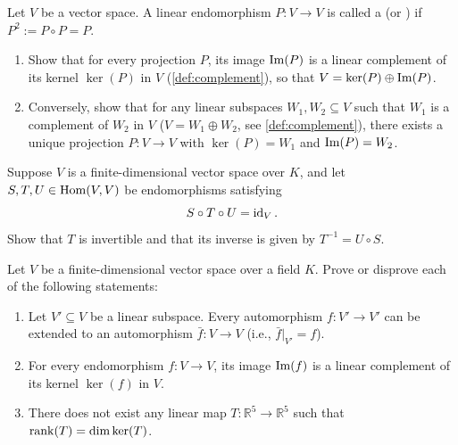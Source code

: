 \begin{exercise}
\label{exc:projections_and_complements}
Let $V$ be a vector space. A linear endomorphism $P \colon V \to V$ is called a  (or ) if $P^2 := P \circ P = P$.
\begin{enumerate}[label=\textbf{(\alph*)}]
    \item Show that for every projection $P$, its image $\operatorname{Im}(P)$ is a linear complement of its kernel $\ker(P)$ in $V$ (\cref{def:complement}), so that $V = \ker(P) \oplus \operatorname{Im}(P)$.
    \item Conversely, show that for any linear subspaces $W_1, W_2 \subseteq V$ such that $W_1$ is a complement of $W_2$ in $V$ ($V = W_1 \oplus W_2$, see \cref{def:complement}), there exists a unique projection $P \colon V \to V$ with $\ker(P) = W_1$ and $\operatorname{Im}(P) = W_2$.
\end{enumerate}
\end{exercise}

\begin{exercise}
\label{exc:invertibility_three_map_composition}
Suppose $V$ is a finite-dimensional vector space over $K$, and let $S, T, U \in \operatorname{Hom}(V, V)$ be endomorphisms satisfying
\[
S \circ T \circ U = \operatorname{id}_V.
\]
Show that $T$ is invertible and that its inverse is given by $T^{-1} = U \circ S$.
\end{exercise}

\begin{exercise}
\label{exc:endomorphism_properties_true_false}
Let $V$ be a finite-dimensional vector space over a field $K$. Prove or disprove each of the following statements:
\begin{enumerate}
    \item Let $V' \subseteq V$ be a linear subspace. Every automorphism $f \colon V' \to V'$ can be extended to an automorphism $\bar{f} \colon V \to V$ (i.e., $\bar{f}|_{V'} = f$).
    \item For every endomorphism $f \colon V \to V$, its image $\operatorname{Im}(f)$ is a linear complement of its kernel $\ker(f)$ in $V$.
    \item There does not exist any linear map $T \colon \mathbb{R}^5 \to \mathbb{R}^5$ such that $\operatorname{rank}(T) = \dim \ker(T)$.
\end{enumerate}
\end{exercise}

